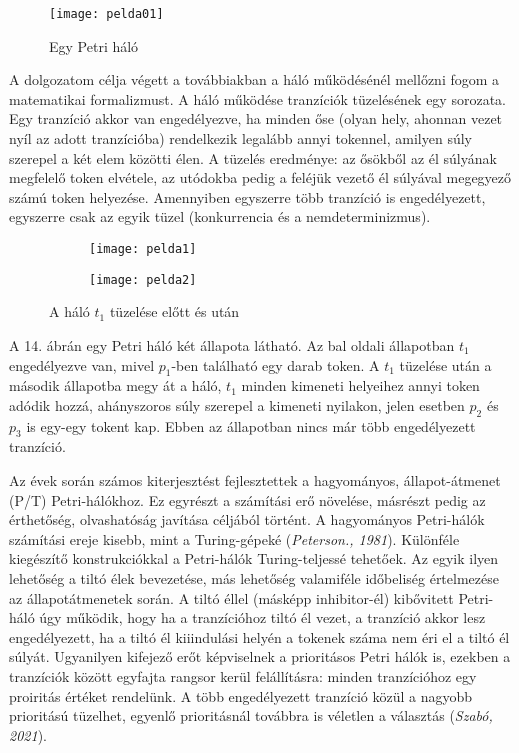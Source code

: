 \documentclass[12pt]{article}
\begin{document}
\begin{wrapfigure}{r}{0.4\textwidth}
\centering
\texttt{[image: pelda01]}
\caption{Egy Petri háló}
\end{wrapfigure}

A dolgozatom célja végett a továbbiakban a háló működésénél mellőzni fogom a matematikai formalizmust. A háló működése tranzíciók tüzelésének egy sorozata. Egy tranzíció akkor van engedélyezve, ha minden őse (olyan hely, ahonnan vezet nyíl az adott tranzícióba) rendelkezik legalább annyi tokennel, amilyen súly szerepel a két elem közötti élen. A tüzelés eredménye: az ősökből az él súlyának megfelelő token elvétele, az utódokba pedig a feléjük vezető él súlyával megegyező számú token helyezése. Amennyiben egyszerre több tranzíció is engedélyezett, egyszerre csak az egyik tüzel (konkurrencia és a nemdeterminizmus).

\begin{figure}[h]
\centering
\begin{subfigure}{0.45\textwidth}
\texttt{[image: pelda1]} 
\end{subfigure}
\begin{subfigure}{0.4\textwidth}
\texttt{[image: pelda2]}
\end{subfigure}
\caption{A háló $t_1$ tüzelése előtt és után}
\end{figure}

A 14. ábrán egy Petri háló két állapota látható. Az bal oldali állapotban $t_1$ engedélyezve van, mivel $p_1$-ben található egy darab token. A $t_1$ tüzelése után a második állapotba megy át a háló, $t_1$ minden kimeneti helyeihez annyi token adódik hozzá, ahányszoros súly szerepel a kimeneti nyilakon, jelen esetben $p_2$ és $p_3$ is egy-egy tokent kap. Ebben az állapotban nincs már több engedélyezett tranzíció.

Az évek során számos kiterjesztést fejlesztettek a hagyományos, állapot-átmenet (P/T) Petri-hálókhoz. Ez egyrészt a számítási erő növelése, másrészt pedig az érthetőség, olvashatóság javítása céljából történt. A hagyományos Petri-hálók számítási ereje kisebb, mint a Turing-gépeké  (\textit{Peterson., 1981}). Különféle kiegészítő konstrukciókkal a Petri-hálók Turing-teljessé tehetőek. Az egyik ilyen lehetőség a tiltó élek bevezetése, más lehetőség valamiféle  időbeliség értelmezése az állapotátmenetek során. A tiltó éllel (másképp inhibitor-él) kibővitett Petri-háló úgy működik, hogy ha a tranzícióhoz tiltó él vezet, a tranzíció akkor lesz engedélyezett, ha a tiltó él kiiindulási helyén a tokenek száma nem éri el a tiltó él súlyát. Ugyanilyen kifejező erőt képviselnek a prioritásos Petri hálók is, ezekben a tranzíciók között egyfajta rangsor kerül felállításra: minden tranzícióhoz egy proiritás értéket rendelünk. A több engedélyezett tranzíció közül a nagyobb prioritású tüzelhet, egyenlő prioritásnál továbbra is véletlen a választás (\textit{Szabó, 2021}).
\end{document}
